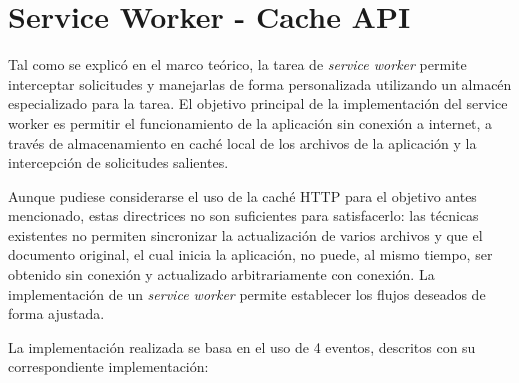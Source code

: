 \section{Service Worker - Cache API}

Tal como se explicó en el marco teórico, la tarea de \textit{service worker} permite interceptar solicitudes y manejarlas de forma personalizada utilizando un almacén especializado para la tarea. El objetivo principal de la implementación del service worker es permitir el funcionamiento de la aplicación sin conexión a internet, a través de almacenamiento en caché local de los archivos de la aplicación y la intercepción de solicitudes salientes.

Aunque pudiese considerarse el uso de la caché HTTP para el objetivo antes mencionado, estas directrices no son suficientes para satisfacerlo: las técnicas existentes no permiten sincronizar la actualización de varios archivos y que el documento original, el cual inicia la aplicación, no puede, al mismo tiempo, ser obtenido sin conexión y actualizado arbitrariamente con conexión. La implementación de un \textit{service worker} permite establecer los flujos deseados de forma ajustada.

La implementación realizada se basa en el uso de 4 eventos, descritos con su correspondiente implementación:

